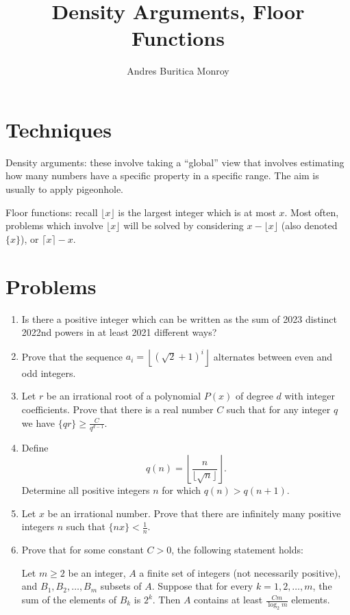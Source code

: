 \documentclass{article}
\title{Density Arguments, Floor Functions}
\author{Andres Buritica Monroy}
\date{}
\begin{document}
\maketitle
\section{Techniques}
  Density arguments: these involve taking a ``global'' view that involves
  estimating how many numbers have a specific property in a specific range.
  The aim is usually to apply pigeonhole.

  Floor functions: recall $\lfloor x\rfloor$ is the largest integer which is at
  most $x$. Most often, problems which involve $\lfloor x\rfloor$ will be
  solved by considering $x-\lfloor x\rfloor$ (also denoted $\{x\}$), or $\lceil
  x\rceil-x$.
\section{Problems}
\begin{enumerate}
  \item Is there a positive integer which can be written as the sum of 2023
    distinct 2022nd powers in at least 2021 different ways?
  \item Prove that the sequence $a_i=\left\lfloor(\sqrt 2+1)^i\right\rfloor$
    alternates between even and odd integers.
  \item Let $r$ be an irrational root of a polynomial $P(x)$ of degree $d$ with
    integer coefficients. Prove that there is a real number $C$ such that for
    any integer $q$ we have $\{qr\}\ge \frac C{q^{d-1}}$.
  \item Define
    \[q(n)=\left\lfloor\frac n{\lfloor\sqrt n\rfloor}\right\rfloor.\]
    Determine all positive integers $n$ for which $q(n)>q(n+1)$.
  \item Let $x$ be an irrational number. Prove that there are infinitely many
    positive integers $n$ such that $\{nx\}<\frac 1n$.
  \item Prove that for some constant $C>0$, the following statement holds:

    Let $m\ge 2$ be an integer, $A$ a finite set of integers (not
    necessarily positive), and $B_1,B_2,\ldots,B_m$ subsets of $A$. Suppose
    that for every $k=1,2,\ldots,m$, the sum of the elements of $B_k$ is
    $2^k$. Then $A$ contains at least $\frac {Cm}{\log_2 m}$ elements.
\end{enumerate}
\newpage
\end{document}
